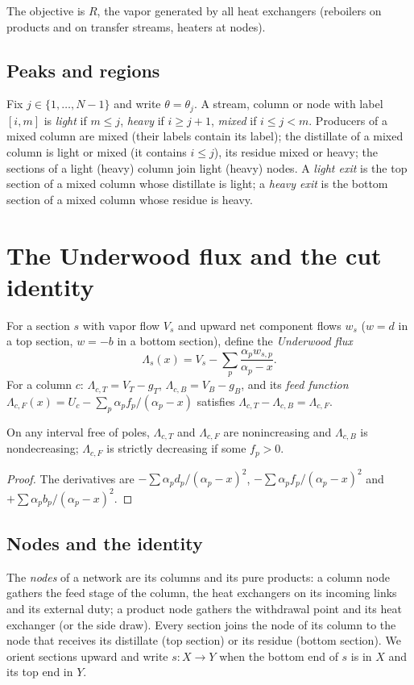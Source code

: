\documentclass[11pt,a4paper]{report}
\newcommand{\Lam}{\Lambda}
\begin{document}
The objective is $R$, the vapor generated by all heat exchangers (reboilers on products and on transfer streams,
heaters at nodes).

\subsection{Peaks and regions}
Fix $j\in\{1,\dots,N-1\}$ and write $\theta=\theta_j$. A stream, column or node with label $[i,m]$ is \emph{light}
if $m\le j$, \emph{heavy} if $i\ge j+1$, \emph{mixed} if $i\le j<m$. Producers of a mixed column are mixed (their labels
contain its label); the distillate of a mixed column is light or mixed (it contains $i\le j$), its residue mixed or
heavy; the sections of a light (heavy) column join light (heavy) nodes. A \emph{light exit} is the top section of a
mixed column whose distillate is light; a \emph{heavy exit} is the bottom section of a mixed column whose residue is
heavy.

\section{The Underwood flux and the cut identity}

For a section $s$ with vapor flow $V_s$ and upward net component flows $w_s$ ($w=d$ in a top section, $w=-b$ in a
bottom section), define the \emph{Underwood flux}
\[\Lam_s(x)=V_s-\sum_p\frac{\alpha_pw_{s,p}}{\alpha_p-x}.\]
For a column $c$: $\Lam_{c,T}=V_T-g_T$, $\Lam_{c,B}=V_B-g_B$, and its \emph{feed function}
$\Lam_{c,F}(x)=U_c-\sum_p\alpha_pf_p/(\alpha_p-x)$ satisfies $\Lam_{c,T}-\Lam_{c,B}=\Lam_{c,F}$.

\begin{lemma}[monotonicity]\label{lem:mono}
On any interval free of poles, $\Lam_{c,T}$ and $\Lam_{c,F}$ are nonincreasing and $\Lam_{c,B}$ is nondecreasing;
$\Lam_{c,F}$ is strictly decreasing if some $f_p>0$.
\end{lemma}
\begin{proof}
The derivatives are $-\sum\alpha_pd_p/(\alpha_p-x)^2$, $-\sum\alpha_pf_p/(\alpha_p-x)^2$ and $+\sum\alpha_pb_p/(\alpha_p-x)^2$.
\end{proof}

\subsection{Nodes and the identity}
The \emph{nodes} of a network are its columns and its pure products: a column node gathers the feed stage of the
column, the heat exchangers on its incoming links and its external duty; a product node gathers the withdrawal point
and its heat exchanger (or the side draw). Every section joins the node of its column to the node that receives its
distillate (top section) or its residue (bottom section). We orient sections upward and write $s\colon X\to Y$ when the
bottom end of $s$ is in $X$ and its top end in $Y$.
\end{document}
